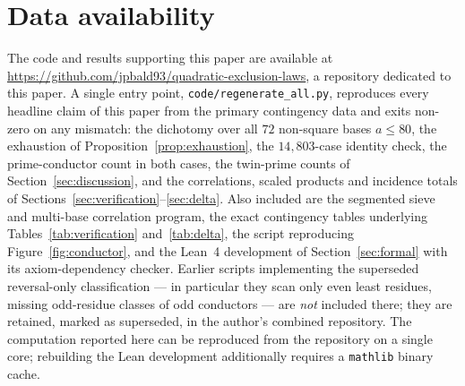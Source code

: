 \documentclass[11pt,reqno]{amsart}
\theoremstyle{plain}
\theoremstyle{definition}
\begin{document}
\section*{Data availability}
The code and results supporting this paper are available at
\url{https://github.com/jpbald93/quadratic-exclusion-laws}, a repository
dedicated to this paper. A single entry point,
\texttt{code/regenerate\_all.py}, reproduces every headline claim of this
paper from the primary contingency data and exits non-zero on any mismatch:
the dichotomy over all $72$ non-square bases $a \le 80$, the exhaustion of
Proposition~\ref{prop:exhaustion}, the $14{,}803$-case identity check, the
prime-conductor count in both cases, the twin-prime counts of
Section~\ref{sec:discussion}, and the correlations, scaled products and
incidence totals of Sections~\ref{sec:verification}--\ref{sec:delta}. Also
included are the segmented sieve and multi-base correlation program, the exact
contingency tables underlying Tables~\ref{tab:verification}
and~\ref{tab:delta}, the script reproducing Figure~\ref{fig:conductor}, and
the Lean~4 development of Section~\ref{sec:formal} with its axiom-dependency
checker. Earlier scripts implementing the superseded reversal-only classification ---
in particular they scan only even least residues, missing odd-residue classes
of odd conductors --- are \emph{not} included there; they are retained, marked
as superseded, in the author's combined repository. The computation reported here can be reproduced from the
repository on a single core; rebuilding the Lean development
additionally requires a \texttt{mathlib} binary cache.
\end{document}
